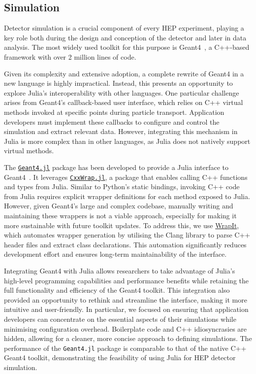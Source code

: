 \documentclass{webofc}
\begin{document}
\subsection{Simulation}
\label{sec:simulation}

Detector simulation is a crucial component of every HEP
experiment, playing a key role both during the design and conception of the
detector and later in data analysis. The most widely used toolkit for this
purpose is Geant4~\cite{GEANT4:2002zbu}, a C++-based framework with over 2
million lines of code.

Given its complexity and extensive adoption, a complete rewrite of Geant4 in a
new language is highly impractical. Instead, this presents an opportunity to
explore Julia's interoperability with other languages. One particular challenge
arises from Geant4's callback-based user interface, which relies on C++ virtual
methods invoked at specific points during particle transport. Application
developers must implement these callbacks to configure and control the
simulation and extract relevant data. However, integrating this
mechanism in Julia is more complex than in other languages, as Julia does not
natively support virtual methods.

The \href{https://github.com/JuliaHEP/Geant4.jl}{\texttt{Geant4.jl}} package has
been developed to provide a Julia interface to Geant4~\cite{ALLISON2016186}. It
leverages
\href{https://github.com/JuliaInterop/CxxWrap.jl}{\texttt{CxxWrap.jl}}, a
package that enables calling C++ functions and types from Julia. Similar to
Python's static bindings, invoking C++ code from Julia requires explicit wrapper
definitions for each method exposed to Julia. However, given Geant4's large and
complex codebase, manually writing and maintaining these wrappers is not a
viable approach, especially for making it more sustainable with future toolkit
updates. To address this, we use
\href{https://github.com/grasph/wrapit}{WrapIt}, which automates wrapper
generation by utilising the Clang library to parse C++ header files and extract
class declarations. This automation significantly reduces development effort and
ensures long-term maintainability of the interface.

Integrating Geant4 with Julia allows researchers to take advantage of Julia's
high-level programming capabilities and performance benefits while retaining the
full functionality and efficiency of the Geant4 toolkit. This integration also
provided an opportunity to rethink and streamline the interface, making it more
intuitive and user-friendly. In particular, we focused on ensuring that
application developers can concentrate on the essential aspects of their
simulations while minimising configuration overhead. Boilerplate code and C++
idiosyncrasies are hidden, allowing for a cleaner, more concise approach to
defining simulations. The performance of the \texttt{Geant4.jl} package is
comparable to that of the native C++ Geant4 toolkit, demonstrating the
feasibility of using Julia for HEP detector simulation.
\end{document}
